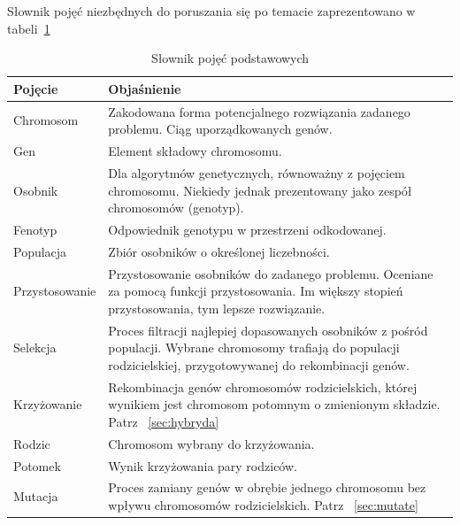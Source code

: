 \documentclass[twoside,a4paper,10]{book}
\begin{document}
Słownik pojęć niezbędnych do poruszania się po temacie zaprezentowano w tabeli~\ref{table:dicTab} \begin{table}
\renewcommand\arraystretch{1.5}
 \centering
    \begin{tabular}{|>{\centering\arraybackslash}m{4cm}|m{8.5cm}|}
     \hline
    \textbf{Pojęcie} & \textbf{Objaśnienie}\\ \hline
     Chromosom& Zakodowana forma potencjalnego rozwiązania zadanego problemu. Ciąg uporządkowanych genów.\\ \hline 
     Gen & Element składowy chromosomu.  \\ \hline
    Osobnik & Dla algorytmów genetycznych, równoważny z pojęciem chromosomu. Niekiedy jednak prezentowany jako zespół chromosomów (genotyp).\\ \hline
     Fenotyp& Odpowiednik genotypu w przestrzeni odkodowanej. \\ \hline
     Populacja& Zbiór osobników o określonej liczebności.\\ \hline
     Przystosowanie& Przystosowanie osobników do zadanego problemu. Oceniane za pomocą funkcji przystosowania. Im większy stopień przystosowania, tym lepsze rozwiązanie. \\ \hline
     Selekcja & Proces filtracji najlepiej dopasowanych osobników z pośród populacji. Wybrane chromosomy trafiają do populacji rodzicielskiej, przygotowywanej do rekombinacji genów.\\ \hline
     Krzyżowanie &  Rekombinacja genów chromosomów rodzicielskich, której wynikiem jest chromosom potomnym o zmienionym składzie. Patrz ~\ref{sec:hybryda}  \\ \hline 
    Rodzic & Chromosom wybrany do krzyżowania. \\ \hline
    Potomek & Wynik krzyżowania pary rodziców. \\ \hline
    Mutacja & Proces zamiany genów w obrębie jednego chromosomu bez wpływu chromosomów rodzicielskich. Patrz ~\ref{sec:mutate}\\ \hline
	\end{tabular}
	 \caption{Słownik pojęć podstawowych} 
    \label{table:dicTab}
\end{table}
\end{document}
